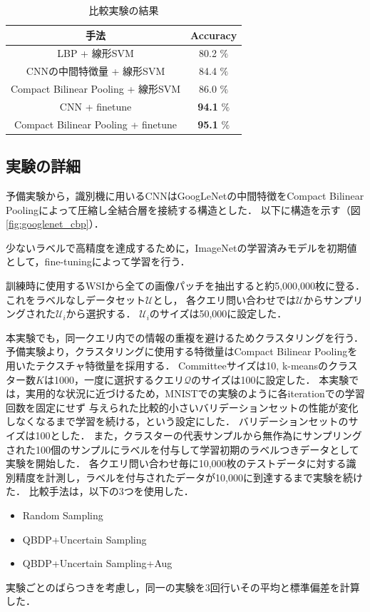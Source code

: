 \begin{table}[h]
  \caption{\label{table:compare_classifier}比較実験の結果}
  \center
  \begin{tabular}{c|c} \hline
    手法 & Accuracy  \\ \hline
    LBP + 線形SVM & 80.2 $\%$ \\
    CNNの中間特徴量 + 線形SVM & 84.4 $\%$  \\ 
    Compact Bilinear Pooling + 線形SVM & 86.0 $\%$ \\ \hline
    CNN + finetune & \textbf{94.1} $\%$  \\ 
    Compact Bilinear Pooling + finetune & \textbf{95.1} $\%$ \\ \hline
  \end{tabular}
\end{table}


\subsection{実験の詳細}
予備実験から，識別機に用いるCNNはGoogLeNetの中間特徴をCompact Bilinear Poolingによって圧縮し全結合層を接続する構造とした．
以下に構造を示す（図\ref{fig:googlenet_cbp}）．

少ないラベルで高精度を達成するために，ImageNetの学習済みモデルを初期値として，fine-tuningによって学習を行う．

訓練時に使用するWSIから全ての画像パッチを抽出すると約5,000,000枚に登る．これをラベルなしデータセット$\mathcal{U}$とし，
各クエリ問い合わせでは$\mathcal{U}$からサンプリングされた$\mathcal{U}_i$から選択する．
$\mathcal{U}_i$のサイズは50,000に設定した．

本実験でも，同一クエリ内での情報の重複を避けるためクラスタリングを行う．
予備実験より，クラスタリングに使用する特徴量はCompact Bilinear Poolingを用いたテクスチャ特徴量を採用する．
Committeeサイズは10, k-meansのクラスター数$K$は1000，一度に選択するクエリ$\mathcal{Q}$のサイズは100に設定した．
本実験では，実用的な状況に近づけるため，MNISTでの実験のように各iterationでの学習回数を固定にせず
与えられた比較的小さいバリデーションセットの性能が変化しなくなるまで学習を続ける，という設定にした．
バリデーションセットのサイズは100とした．
また，クラスターの代表サンプルから無作為にサンプリングされた100個のサンプルにラベルを付与して学習初期のラベルつきデータとして実験を開始した．
各クエリ問い合わせ毎に10,000枚のテストデータに対する識別精度を計測し，ラベルを付与されたデータが10,000に到達するまで実験を続けた．
比較手法は，以下の3つを使用した．
\begin{itemize}
  \item Random Sampling
  \item QBDP+Uncertain Sampling
  \item QBDP+Uncertain Sampling+Aug
\end{itemize}
実験ごとのばらつきを考慮し，同一の実験を3回行いその平均と標準偏差を計算した．

